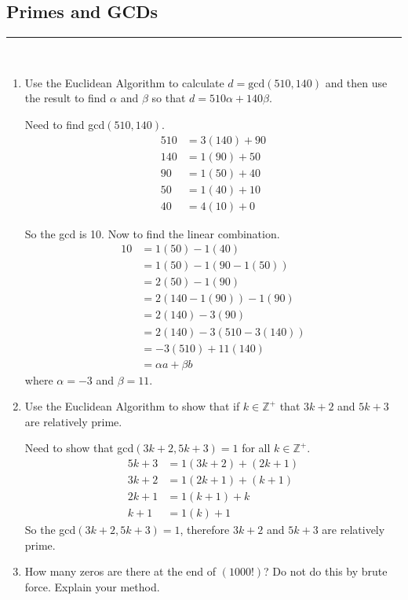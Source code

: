 \documentclass[class=article, crop=false]{standalone}
\def\integers{{\mathbb Z}}
\begin{document}
\subsection{Primes and GCDs}
\hfill {}
\rule{\textwidth}{1pt}\\
\begin{enumerate}
\item
 Use the Euclidean Algorithm to calculate $d=\mbox{gcd}(510,140)$
  and then use the result to find $\alpha$ and $\beta$ so
  that $d=510\alpha+140\beta$.\hfill{}

  Need to find gcd$(510,140)$.
  \begin{align*}
	510 &= 3(140) + 90 \\
	140 &= 1(90) + 50 \\
	90 &= 1(50) + 40 \\
	50 &= 1(40) + 10 \\
	40 &= 4(10) + 0
  \end{align*}

  So the gcd is 10. Now to find the linear combination.
  \begin{align*}
	10 &= 1(50) - 1(40) \\
	&= 1(50) - 1(90-1(50)) \\
	&= 2(50) - 1(90) \\
	&= 2(140-1(90)) - 1(90) \\
	&= 2(140) -3(90) \\
	&= 2(140) -3(510-3(140)) \\
	&= -3(510) +11(140) \\
	&= \alpha a+ \beta b
  \end{align*}
  where $\alpha = -3$ and $\beta = 11$.

\item
  Use the Euclidean Algorithm to show that if $k\in\integers^+$ that
  $3k+2$ and $5k+3$ are relatively prime.\hfill{}

  Need to show that gcd$(3k+2, 5k+3)=1$ for all $k\in\integers^+$.
  \begin{align*}
	5k+3 &= 1(3k+2) + (2k+1) \\
	3k+2 &= 1(2k+1) + (k+1) \\
	2k+1 &= 1(k+1) + k \\
	k+1 &= 1(k) + 1
  \end{align*}
  So the gcd$(3k+2,5k+3)=1$, therefore $3k+2$ and $5k+3$ are relatively prime.

\item
  How many zeros are there at the end of $(1000!)$?  Do not do this
  by brute force.  Explain your method.\hfill{}


\end{enumerate}
\end{document}
